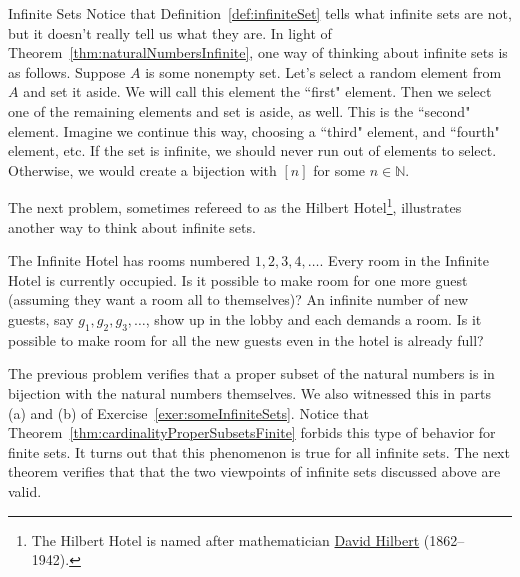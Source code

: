 \begin{section}{Infinite Sets}
Notice that Definition~\ref{def:infiniteSet} tells what infinite sets are not, but it doesn't really tell us what they are. In light of Theorem~\ref{thm:naturalNumbersInfinite}, one way of thinking about infinite sets is as follows.  Suppose $A$ is some nonempty set. Let's select a random element from $A$ and set it aside. We will call this element the ``first" element.  Then we select one of the remaining elements and set is aside, as well.  This is the ``second" element.  Imagine we continue this way, choosing a ``third" element, and ``fourth" element, etc.  If the set is infinite, we should never run out of elements to select. Otherwise, we would create a bijection with $[n]$ for some $n\in\mathbb{N}$.

The next problem, sometimes refereed to as the Hilbert Hotel\footnote{The Hilbert Hotel is named after mathematician \href{https://en.wikipedia.org/wiki/David_Hilbert}{David Hilbert} (1862--1942).}, illustrates another way to think about infinite sets.

\begin{problem}
The Infinite Hotel has rooms numbered $1,2,3,4,\ldots$. Every room in the Infinite Hotel is currently occupied.  Is it possible to make room for one more guest (assuming they want a room all to themselves)?  An infinite number of new guests, say $g_1, g_2,g_3,\ldots$, show up in the lobby and each demands a room.  Is it possible to make room for all the new guests even in the hotel is already full?
\end{problem}

The previous problem verifies that a proper subset of the natural numbers is in bijection with the natural numbers themselves. We also witnessed this in parts (a) and (b) of Exercise~\ref{exer:someInfiniteSets}. Notice that Theorem~\ref{thm:cardinalityProperSubsetsFinite} forbids this type of behavior for finite sets. It turns out that this phenomenon is true for all infinite sets. The next theorem verifies that that the two viewpoints of infinite sets discussed above are valid.


\end{section}
